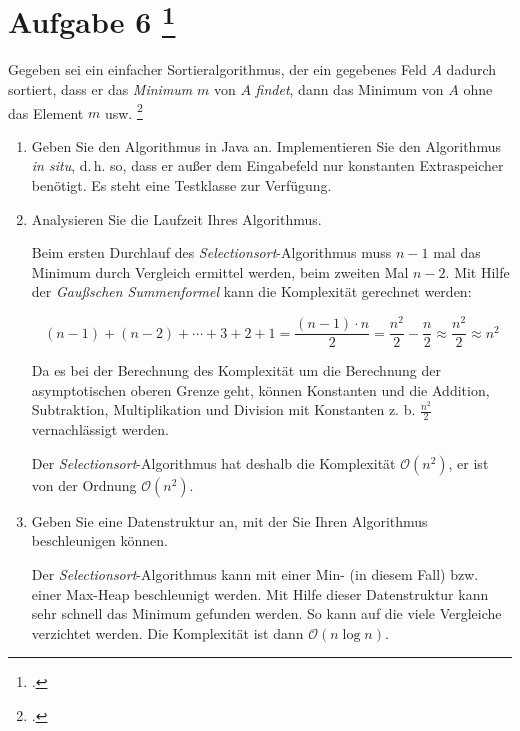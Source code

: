 \documentclass{lehramt-informatik-aufgabe}
\begin{document}

\section{Aufgabe 6
\footcite[Aufgabe 4, Seite 4]{aud:ab:3}}

Gegeben sei ein einfacher Sortieralgorithmus, der ein gegebenes Feld $A$
dadurch sortiert, dass er das \emph{Minimum} $m$ von $A$ \emph{findet},
dann das Minimum von $A$ ohne das Element $m$ usw.
\footcite[Thema 2 Aufgabe 6 Seite 5]{examen:66115:2014:09}

\begin{enumerate}


\item Geben Sie den Algorithmus in Java an.
Implementieren Sie den Algorithmus
\emph{in situ}, d.\,h. so, dass er außer dem Eingabefeld nur konstanten
Extraspeicher benötigt. Es steht eine Testklasse zur Verfügung.

\begin{liAntwort}
\end{liAntwort}


\item Analysieren Sie die Laufzeit Ihres Algorithmus.

\begin{liAntwort}
Beim ersten Durchlauf des \emph{Selectionsort}-Algorithmus muss $n - 1$
mal das Minimum durch Vergleich ermittel werden, beim zweiten Mal
$n - 2$.
Mit Hilfe der \emph{Gaußschen Summenformel} kann die Komplexität
gerechnet werden:

\begin{displaymath}
(n-1)+(n-2)+\dotsb+3+2+1 =
\frac{(n-1)\cdot n}{2} =
\frac{n^2}{2}-\frac{n}{2} \approx
\frac{n^2}{2} \approx
n^2
\end{displaymath}

Da es bei der Berechnung des Komplexität um die Berechnung der
asymptotischen oberen Grenze geht, können Konstanten und die Addition,
Subtraktion, Multiplikation und Division mit Konstanten z. b.
$\frac{n^2}{2}$ vernachlässigt werden.

Der \emph{Selectionsort}-Algorithmus hat deshalb die Komplexität
$\mathcal{O}(n^2)$, er ist von der Ordnung
$\mathcal{O}(n^2)$.
\end{liAntwort}


\item Geben Sie eine Datenstruktur an, mit der Sie Ihren Algorithmus
beschleunigen können.

\begin{liAntwort}
Der \emph{Selectionsort}-Algorithmus kann mit einer Min- (in diesem
Fall) bzw. einer Max-Heap beschleunigt werden. Mit Hilfe dieser
Datenstruktur kann sehr schnell das Minimum gefunden werden. So kann auf
die viele Vergleiche verzichtet werden. Die Komplexität ist dann
$\mathcal{O}(n \log n)$.
\end{liAntwort}
\end{enumerate}
\end{document}
